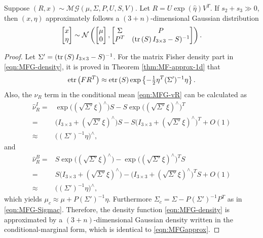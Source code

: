 \begin{theorem}
	Suppose $(R,x) \sim \mathcal{MG}(\mu,\allowbreak \Sigma,\allowbreak P,\allowbreak U,\allowbreak S,\allowbreak V)$.
	Let $R=U\exp(\hat{\eta})V^T$.
	If $s_2+s_3 \gg 0$, then $(x,\eta)$ approximately follows a $(3+n)$-dimensional Gaussian distribution
	\begin{align}
		\begin{bmatrix} x \\ \eta \end{bmatrix}
		\sim
		\mathcal{N} \left(
		\begin{bmatrix} \mu \\ 0 \end{bmatrix},
		\begin{bmatrix} \Sigma & P \\ P^T & (\mathrm{tr}\left( S \right)I_{3 \times 3}-S)^{-1} \end{bmatrix}
		\right).\label{eqn:MFGapprox}
	\end{align}
\end{theorem}
\begin{proof}
	Let $\Sigma' = (\mathrm{tr}\left( S \right)I_{3\times 3}-S)^{-1}$.
	For the matrix Fisher density part in \eqref{eqn:MFG-density}, it is proved in Theorem \ref{thm:MF-approx-1d} that
	\begin{align*}
		\mathrm{etr}\left( FR^T \right) \approx \mathrm{etr}\left( S \right) \exp\left\{ -\tfrac{1}{2}\eta^T (\Sigma')^{-1} \eta \right\}.
	\end{align*}
	Also, the $\nu_R$ term in the conditional mean \eqref{eqn:MFG-vR} can be calculated as
	\begin{align*}
		\hat\nu_R^I = &\exp\big((\sqrt{\Sigma'}\xi)^\wedge\big)S - S\exp\big((\sqrt{\Sigma'}\xi)^\wedge\big)^T  \\
		= &\big( I_{3\times 3} + (\sqrt{\Sigma'}\xi)^\wedge \big)S - S\big( I_{3\times 3} + (\sqrt{\Sigma'}\xi)^\wedge \big)^T + O(1) \\
		\approx &\big((\Sigma')^{-1}\eta\big)^\wedge,
	\end{align*}
	and
	\begin{align*}
		\hat\nu_R^B = &S\exp\big((\sqrt{\Sigma'}\xi)^\wedge\big) - \exp\big((\sqrt{\Sigma'}\xi)^\wedge\big)^TS  \\
		= &S\big( I_{3\times 3} + (\sqrt{\Sigma'}\xi)^\wedge \big) - \big( I_{3\times 3} + (\sqrt{\Sigma'}\xi)^\wedge \big)^TS + O(1) \\
		\approx &\big((\Sigma')^{-1}\eta\big)^\wedge,
	\end{align*}
	which yields $\mu_c \approx \mu+P(\Sigma')^{-1}\eta$.
	Furthermore $\Sigma_c = \Sigma - P(\Sigma')^{-1}P^T$ as in \eqref{eqn:MFG-Sigmac}. 
	Therefore, the density function \eqref{eqn:MFG-density} is approximated by a $(3+n)$-dimensional Gaussian density written in the conditional-marginal form, which is identical to \eqref{eqn:MFGapprox}.
\end{proof}

